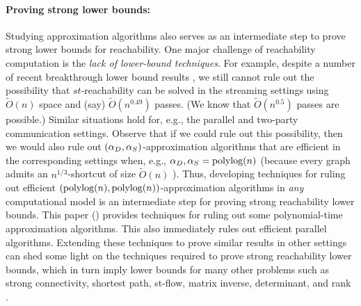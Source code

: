 \paragraph{Proving strong lower bounds:}
Studying approximation algorithms also serves as an intermediate step to prove strong lower bounds for reachability. 
One major challenge of reachability computation is the {\em lack of lower-bound techniques}. For example, despite a number of recent breakthrough lower bound results \cite{CKPS0Y21,AssadiR20, AssadiCK19,GuruswamiO16}, we still cannot rule out the possibility that $st$-reachability can be solved in the streaming settings using $\tilde O(n)$ space and (say) $\tilde O(n^{0.49})$ passes. (We know that $\tilde O(n^{0.5})$ passes are possible.) 
Similar situations hold for, e.g., the parallel and two-party communication settings. 
Observe that if we could rule out this possibility, then we would also rule out $(\alpha_D,\alpha_S)$-approximation algorithms that are efficient in the corresponding settings when, e.g., $\alpha_D,\alpha_S=\mathrm{polylog}(n)$ (because every graph admits an $n^{1/3}$-shortcut of size $
\tilde O(n)$ \cite{KoganP22}). 
Thus, developing techniques for ruling out efficient $(\mathrm{polylog}(n),\mathrm{polylog}(n))$-approximation algorithms in {\em any} computational model is an intermediate step for proving strong reachability lower bounds.
This paper () provides techniques for ruling out some polynomial-time approximation algorithms. This also immediately rules out efficient parallel algorithms. Extending these techniques to prove similar results in other settings can shed some light on the techniques required to prove strong reachability lower bounds, which in turn imply lower bounds for many other problems such as strong connectivity, shortest path, st-flow, matrix inverse, determinant, and rank \cite{AbboudD16,BrandNS19}.

